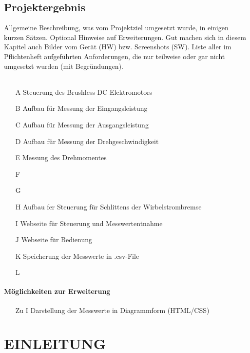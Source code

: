 \documentclass[12pt,a4paper]{article}
\newcommand{\yhbu}[0]{\color{ydkbu}}	%
\begin{document}
\subsection*{Projektergebnis}
{\yhbu
	Allgemeine Beschreibung, was vom Projektziel umgesetzt wurde, in einigen
	kurzen Sätzen. Optional Hinweise auf Erweiterungen. Gut machen sich in diesem
	Kapitel auch Bilder vom Gerät (HW) bzw. Screenshots (SW).
	Liste aller im Pflichtenheft aufgeführten Anforderungen, die nur teilweise oder gar
	nicht umgesetzt wurden (mit Begründungen).\\\\}
%	
\begin{itemize}
\item[A]Steuerung des Brushless-DC-Elektromotors
\item[B]Aufbau für Messung der Eingangsleistung
\item[C]Aufbau für Messung der Ausgangsleistung
\item[D]Aufbau für Messung der Drehgeschwindigkeit
\item[E]Messung des Drehmomentes
\item[F]
\item[G]
\item[H]Aufbau fer Steuerung für Schlittens der Wirbelstrombremse
\item[I]Webseite für Steuerung und Messwertentnahme
\item[J]Webseite für Bedienung 
\item[K]Speicherung der Messwerte in .csv-File
\item[L]
\end{itemize}
%
\paragraph*{Möglichkeiten zur Erweiterung}
\begin{itemize}
\item[Zu I]Darstellung der Messwerte in Diagrammform (HTML/CSS)
\end{itemize}
%
%
\newpage
\tableofcontents
%
\cfoot{\thesection-\rightmark}	%
\noindent%
\newpage
\setcounter{section}{0}
\section{EINLEITUNG}
%
\end{document}
